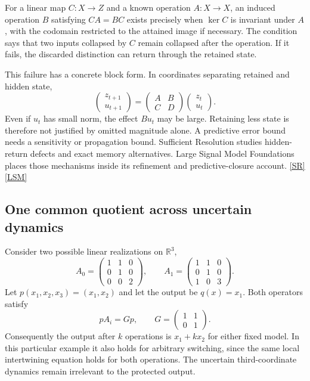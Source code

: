 \documentclass[11pt,oneside]{article}
\newcommand{\src}[1]{\hyperlink{cat:#1}{\textsf{[#1]}}}
\newcommand{\kerop}{\operatorname{ker}}
\begin{document}
For a linear map $C:X\to Z$ and a known operation $A:X\to X$, an induced operation $B$ satisfying $CA=BC$ exists precisely when $\kerop C$ is invariant under $A$, with the codomain restricted to the attained image if necessary. The condition says that two inputs collapsed by $C$ remain collapsed after the operation. If it fails, the discarded distinction can return through the retained state.

This failure has a concrete block form. In coordinates separating retained and hidden state,
\[
\begin{pmatrix}z_{t+1}\\u_{t+1}\end{pmatrix}
=
\begin{pmatrix}A&B\\C&D\end{pmatrix}
\begin{pmatrix}z_t\\u_t\end{pmatrix}.
\]
Even if $u_t$ has small norm, the effect $Bu_t$ may be large. Retaining less state is therefore not justified by omitted magnitude alone. A predictive error bound needs a sensitivity or propagation bound. Sufficient Resolution studies hidden-return defects and exact memory alternatives. Large Signal Model Foundations places those mechanisms inside its refinement and predictive-closure account. \src{SR}\src{LSM}

\subsection{One common quotient across uncertain dynamics}
Consider two possible linear realizations on $\mathbb R^3$,
\[
A_0=\begin{pmatrix}1&1&0\\0&1&0\\0&0&2\end{pmatrix},\qquad
A_1=\begin{pmatrix}1&1&0\\0&1&0\\1&0&3\end{pmatrix}.
\]
Let $p(x_1,x_2,x_3)=(x_1,x_2)$ and let the output be $q(x)=x_1$. Both operators satisfy
\[
pA_i=Gp,\qquad G=\begin{pmatrix}1&1\\0&1\end{pmatrix}.
\]
Consequently the output after $k$ operations is $x_1+kx_2$ for either fixed model. In this particular example it also holds for arbitrary switching, since the same local intertwining equation holds for both operations. The uncertain third-coordinate dynamics remain irrelevant to the protected output.
\end{document}
